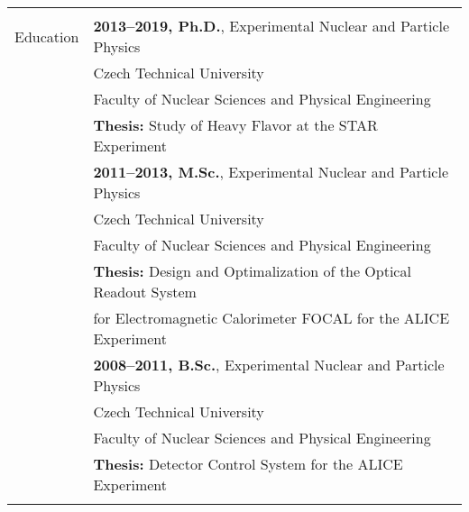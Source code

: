 \documentclass[a4paper,11pt,oneside]{article}
\begin{document}
\noindent \begin{tabular}{@{} l l}
\hline \\
 \Large{Education}   
     & \textbf{2013--2019, Ph.D.}, Experimental Nuclear and Particle Physics \\
     & {Czech Technical University} \\
     & {Faculty of Nuclear Sciences and Physical Engineering} \\
     & \textbf{Thesis:} Study of Heavy Flavor at the STAR Experiment \\[.2cm]
     & \textbf{2011--2013, M.Sc.}, Experimental Nuclear and Particle Physics \\
     & {Czech Technical University} \\
     & {Faculty of Nuclear Sciences and Physical Engineering} \\
     & \textbf{Thesis:} Design and Optimalization of the Optical Readout System \\
     & for Electromagnetic Calorimeter FOCAL for the ALICE Experiment \\[.2cm]
     & \textbf{2008--2011, B.Sc.}, Experimental Nuclear and Particle Physics \\
     & {Czech Technical University} \\
     & {Faculty of Nuclear Sciences and Physical Engineering} \\
     & \textbf{Thesis:} Detector Control System for the ALICE Experiment \\
     \\
   

\end{tabular}
\end{document}
